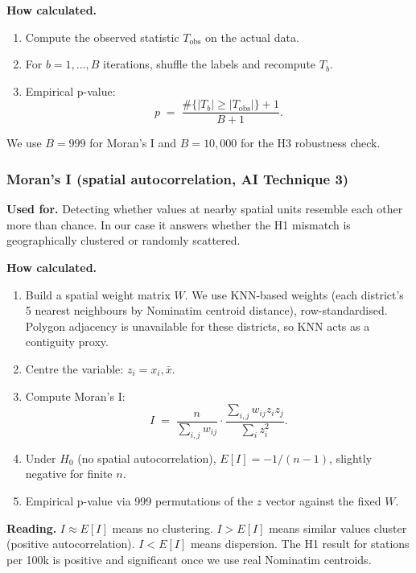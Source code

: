 \textbf{How calculated.}
\begin{enumerate}
 \item Compute the observed statistic $T_\text{obs}$ on the actual
 data.
 \item For $b = 1, \ldots, B$ iterations, shuffle the labels and
 recompute $T_b$.
 \item Empirical p-value:
 \begin{equation*}
 p \;=\; \frac{\#\{|T_b| \geq |T_\text{obs}|\} + 1}{B + 1}.
 \end{equation*}
\end{enumerate}

We use $B = 999$ for Moran's I and $B = 10{,}000$ for the H3
robustness check.

\subsubsection{Moran's I (spatial autocorrelation, AI Technique 3)}

\textbf{Used for.} Detecting whether values at nearby spatial units
resemble each other more than chance. In our case it answers whether
the H1 mismatch is geographically clustered or randomly scattered.

\textbf{How calculated.}

\begin{enumerate}
 \item Build a spatial weight matrix $W$. We use KNN-based weights
 (each district's 5 nearest neighbours by Nominatim centroid
 distance), row-standardised. Polygon adjacency is unavailable
 for these districts, so KNN acts as a contiguity proxy.
 \item Centre the variable: $z_i = x_i, \bar{x}$.
 \item Compute Moran's I:
 \begin{equation*}
 I \;=\; \frac{n}{\sum_{i,j} w_{ij}}
 \cdot \frac{\sum_{i,j} w_{ij} z_i z_j}
 {\sum_i z_i^2}.
 \end{equation*}
 \item Under $H_0$ (no spatial autocorrelation),
 $E[I] = -1/(n-1)$, slightly negative for finite $n$.
 \item Empirical p-value via 999 permutations of the $z$ vector
 against the fixed $W$.
\end{enumerate}

\textbf{Reading.} $I \approx E[I]$ means no clustering. $I > E[I]$
means similar values cluster (positive autocorrelation). $I < E[I]$
means dispersion. The H1 result for stations per 100k is positive
and significant once we use real Nominatim centroids.

